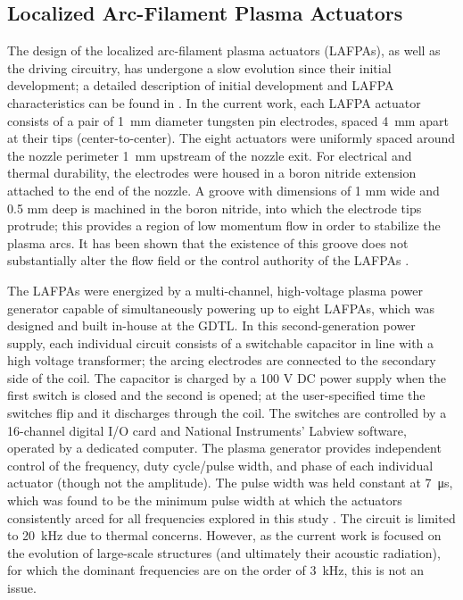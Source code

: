 \subsection{Localized Arc-Filament Plasma Actuators}
The design of the localized arc-filament plasma actuators (LAFPAs), as well as the driving circuitry, has undergone a slow evolution since their initial development; a detailed description of initial development and LAFPA characteristics can be found in \citet{Utkin2007}.
In the current work, each LAFPA actuator consists of a pair of 1~mm diameter tungsten pin electrodes, spaced 4~mm apart at their tips (center-to-center).
The eight actuators were uniformly spaced around the nozzle perimeter 1~mm upstream of the nozzle exit. 
For electrical and thermal durability, the electrodes were housed in a boron nitride extension attached to the end of the nozzle. 
A groove with dimensions of 1 mm wide and 0.5 mm deep is machined in the boron nitride, into which the electrode tips protrude; this provides a region of low momentum flow in order to stabilize the plasma arcs. 
It has been shown that the existence of this groove does not substantially alter the flow field or the control authority of the LAFPAs \citep{Hahn2011a}. 

The LAFPAs were energized by a multi-channel, high-voltage plasma power generator capable of simultaneously powering up to eight LAFPAs, which was designed and built in-house at the GDTL. 
In this second-generation power supply, each individual circuit consists of a switchable capacitor in line with a high voltage transformer; the arcing electrodes are connected to the secondary side of the coil. 
The capacitor is charged by a 100 V DC power supply when the first switch is closed and the second is opened; at the user-specified time the switches flip and it discharges through the coil. 
The switches are controlled by a 16-channel digital I/O card and National Instruments' Labview software, operated by a dedicated computer. The plasma generator provides independent control of the frequency, duty cycle/pulse width, and phase of each individual actuator (though not the amplitude). 
The pulse width was held constant at 7~μs, which was found to be the minimum pulse width at which the actuators consistently arced for all frequencies explored in this study \citep{Hahn2011a}. 
The circuit is limited to 20~kHz due to thermal concerns.
However, as the current work is focused on the evolution of large-scale structures (and ultimately their acoustic radiation), for which the dominant frequencies are on the order of 3~kHz, this is not an issue.

